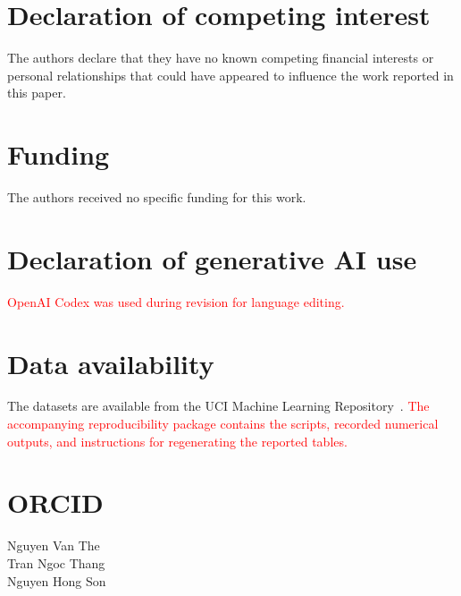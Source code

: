 \documentclass[]{interact}
\theoremstyle{plain}
\theoremstyle{definition}
\theoremstyle{remark}
\begin{document}
\section*{Declaration of competing interest}
The authors declare that they have no known competing financial interests or personal relationships that could have appeared to influence the work reported in this paper.
\section*{Funding}
The authors received no specific funding for this work.
\section*{Declaration of generative AI use}
\leavevmode\textcolor{red}{OpenAI Codex was used during revision for language editing.}
\section*{Data availability}
The datasets are available from the UCI Machine Learning Repository~\citep{kelly2023uci}. \leavevmode\textcolor{red}{The accompanying reproducibility package contains the scripts, recorded numerical outputs, and instructions for regenerating the reported tables.}

\section*{ORCID}
\noindent Nguyen Van The~\\
Tran Ngoc Thang~\\
Nguyen Hong Son~
\end{document}
